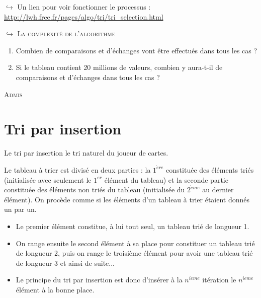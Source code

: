 \documentclass[a4paper,french]{article}
\begin{document}
$\hookrightarrow$ Un lien pour voir fonctionner le processus : 
\url{http://lwh.free.fr/pages/algo/tri/tri_selection.html}
\bigskip

$\hookrightarrow$ \textsc{La complexité de l'algorithme}

\begin{enumerate}
\item Combien de comparaisons et d'échanges vont être effectués dans tous les cas  ?
\\
\item Si le tableau contient 20 millions de valeurs, combien y aura-t-il de comparaisons et d'échanges dans tous les cas ?
\end{enumerate}
\bigskip

\textsc{Admis}
\\

\pagebreak

\section{Tri par insertion}

Le tri par insertion le tri \og naturel \fg du joueur de cartes. 

Le tableau à trier est \og divisé \fg en deux parties : la $1^{\grave{e}re}$ constituée des éléments triés (initialisée avec seulement le $1^{er}$ élément du tableau) et la seconde partie constituée des éléments non triés du tableau (initialisée du $2^{\grave{e}me}$ au dernier élément). On procède comme si les éléments d'un tableau à trier étaient donnés un par un.
\medskip

\begin{itemize}
\item Le premier élément constitue, à lui tout seul, un tableau trié de longueur 1.

\item On range ensuite le second élément \og à sa place \fg pour constituer un tableau trié de longueur 2, puis on range le troisième élément pour avoir une tableau trié de longueur 3 et ainsi de suite... 

\item Le principe du tri par insertion est donc d'insérer à la $n^{ieme}$ itération le $n^{ieme}$ élément à la \og bonne \fg place.
\end{itemize}  
\bigskip
\end{document}
